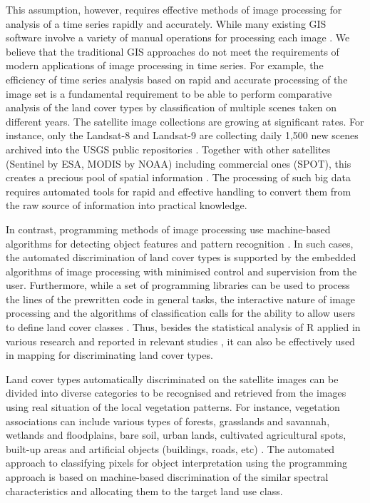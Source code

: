 \documentclass[remotesensing,article,submit,pdftex,moreauthors]{Definitions/mdpi}
\begin{document}
This assumption, however, requires effective methods of image processing for analysis of a time series rapidly and accurately. While many existing GIS software involve a variety of manual operations for processing each image \cite{TAPPAN200738,SPIEKERMANN2015113,EPUH2022100067}. We believe that the traditional GIS approaches do not meet the requirements of modern applications of image processing in time series. For example, the efficiency of time series analysis based on rapid and accurate processing of the image set is a fundamental requirement to be able to perform comparative analysis of the land cover types by classification of multiple scenes taken on different years. The satellite image collections are growing at significant rates. For instance, only the Landsat-8 and Landsat-9 are collecting daily 1,500 new scenes archived into the USGS public repositories \cite{USGS}. Together with other satellites (Sentinel by ESA, MODIS by NOAA) including commercial ones (SPOT), this creates a precious pool of spatial information \cite{MainiAgrawal}. The processing of such big data requires automated tools for rapid and effective handling to convert them from the raw source of information into practical knowledge.  

In contrast, programming methods of image processing use machine-based algorithms for detecting object features and pattern recognition \cite{9297369,jimaging8120317,8882177,9121731}. In such cases, the automated discrimination of land cover types is supported by the embedded algorithms of image processing with minimised control and supervision from the user. Furthermore, while a set of programming libraries can be used to process the lines of the prewritten code in general tasks, the interactive nature of image processing and the algorithms of classification calls for the ability to allow users to define land cover classes \cite{Liuetal2009}. Thus, besides the statistical analysis of R applied in various research and reported in relevant studies \cite{BIVAND20001043,Lemenkova201991,GRUNSKY20021219}, it can also be effectively used in mapping for discriminating land cover types. 

Land cover types automatically discriminated on the satellite images can be divided into diverse categories to be recognised and retrieved from the images using real situation of the local vegetation patterns. For instance, vegetation associations can include various types of forests, grasslands and savannah, wetlands and floodplains, bare soil, urban lands, cultivated agricultural spots, built-up areas and artificial objects (buildings, roads, etc) \cite{lillesand1994remote}. The automated approach to classifying pixels for object interpretation using the programming approach is based on machine-based discrimination of the similar spectral characteristics and allocating them to the target land use class.
\end{document}
